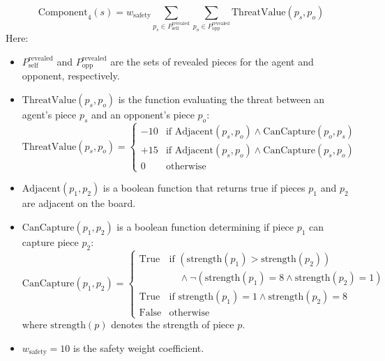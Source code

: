 \documentclass{article}
\begin{document}
\begin{enumerate}
            
            \begin{equation}
                \label{eq:safety}
                \text{Component}_4(s) = w_{\text{safety}} \sum_{p_s \in P_{\text{self}}^{\text{revealed}}} \sum_{p_o \in P_{\text{opp}}^{\text{revealed}}} \text{ThreatValue}(p_s, p_o)
            \end{equation}
            Here:
            \begin{itemize}
                \item $P_{\text{self}}^{\text{revealed}}$ and $P_{\text{opp}}^{\text{revealed}}$ are the sets of revealed pieces for the agent and opponent, respectively.
                \item $\text{ThreatValue}(p_s, p_o)$ is the function evaluating the threat between an agent's piece $p_s$ and an opponent's piece $p_o$:
                \begin{equation}
                \label{eq:threat_value}
                \text{ThreatValue}(p_s, p_o) = \begin{cases}
                -10 & \text{if } \text{Adjacent}(p_s, p_o) \land \text{CanCapture}(p_o, p_s) \\
                +15 & \text{if } \text{Adjacent}(p_s, p_o) \land \text{CanCapture}(p_s, p_o) \\
                0 & \text{otherwise}
                \end{cases}
                \end{equation}
                \item $\text{Adjacent}(p_1, p_2)$ is a boolean function that returns true if pieces $p_1$ and $p_2$ are adjacent on the board.
                \item $\text{CanCapture}(p_1, p_2)$ is a boolean function determining if piece $p_1$ can capture piece $p_2$:
                \begin{equation}
                \label{eq:can_capture}
                \text{CanCapture}(p_1, p_2) = \begin{cases}
                \text{True} & \text{if } (\text{strength}(p_1) > \text{strength}(p_2)) \\ & \quad \land \neg(\text{strength}(p_1) = 8 \land \text{strength}(p_2) = 1) \\
                \text{True} & \text{if } \text{strength}(p_1) = 1 \land \text{strength}(p_2) = 8 \\
                \text{False} & \text{otherwise}
                \end{cases}
                \end{equation}
                where $\text{strength}(p)$ denotes the strength of piece $p$.
                \item $w_{\text{safety}} = 10$ is the safety weight coefficient.
            \end{itemize}
            
    
\end{enumerate}
\end{document}
